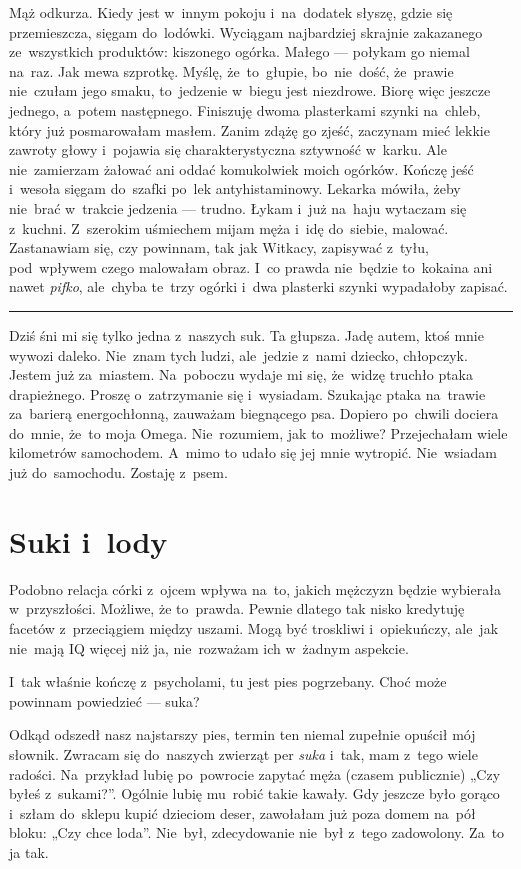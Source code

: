 \documentclass[9pt, a5paper]{memoir}
\begin{document}
Mąż odkurza. Kiedy jest w~innym pokoju i~na~dodatek słyszę, gdzie się przemieszcza, sięgam do~lodówki. Wyciągam najbardziej skrajnie zakazanego ze~wszystkich produktów: kiszonego ogórka. Małego --- połykam go niemal na~raz. Jak mewa szprotkę. Myślę, że~to~głupie, bo~nie~dość, że~prawie nie~czułam jego smaku, to~jedzenie w~biegu jest niezdrowe. Biorę więc jeszcze jednego, a~potem następnego. Finiszuję dwoma plasterkami szynki na~chleb, który już posmarowałam masłem. Zanim zdążę go zjeść, zaczynam mieć lekkie zawroty głowy i~pojawia się charakterystyczna sztywność w~karku. Ale nie~zamierzam żałować ani oddać komukolwiek moich ogórków. Kończę jeść i~wesoła sięgam do~szafki po~lek antyhistaminowy. Lekarka mówiła, żeby nie~brać w~trakcie jedzenia --- trudno. Łykam i~już na~haju wytaczam się z~kuchni. Z~szerokim uśmiechem mijam męża i~idę do~siebie, malować. Zastanawiam się, czy powinnam, tak jak Witkacy, zapisywać z~tyłu, pod~wpływem czego malowałam obraz. I~co prawda nie~będzie to~kokaina ani nawet \textit{pifko}, ale~chyba te~trzy ogórki i~dwa plasterki szynki wypadałoby zapisać.

\fancybreak{* \quad * \quad *}

Dziś śni mi się tylko jedna z~naszych suk. Ta głupsza. Jadę autem, ktoś mnie wywozi daleko. Nie~znam tych ludzi, ale~jedzie z~nami dziecko, chłopczyk. Jestem już za~miastem. Na~poboczu wydaje mi się, że~widzę truchło ptaka drapieżnego. Proszę o~zatrzymanie się i~wysiadam. Szukając ptaka na~trawie za~barierą energochłonną, zauważam biegnącego psa. Dopiero po~chwili dociera do~mnie, że~to moja Omega. Nie~rozumiem, jak to~możliwe? Przejechałam wiele kilometrów samochodem. A~mimo to udało się jej mnie wytropić. Nie~wsiadam już do~samochodu. Zostaję z~psem.

\newpage
\section{Suki i~lody}
Podobno relacja córki z~ojcem wpływa na~to, jakich mężczyzn będzie wybierała w~przyszłości. Możliwe, że to~prawda. Pewnie dlatego tak nisko kredytuję facetów z~przeciągiem między uszami. Mogą być troskliwi i~opiekuńczy, ale~jak nie~mają IQ więcej niż ja, nie~rozważam ich w~żadnym aspekcie.

I~tak właśnie kończę z~psycholami, tu jest pies pogrzebany. Choć może powinnam powiedzieć --- suka?

Odkąd odszedł nasz najstarszy pies, termin ten niemal zupełnie opuścił mój słownik. Zwracam się do~naszych zwierząt per \textit{suka} i~tak, mam z~tego wiele radości. Na~przykład lubię po~powrocie zapytać męża (czasem publicznie) „Czy byłeś z~sukami?”. Ogólnie lubię mu~robić takie kawały. Gdy jeszcze było gorąco i~szłam do~sklepu kupić dzieciom deser, zawołałam już poza domem na~pół bloku: „Czy chce loda”. Nie~był, zdecydowanie nie~był z~tego zadowolony. Za~to ja tak.
\end{document}
